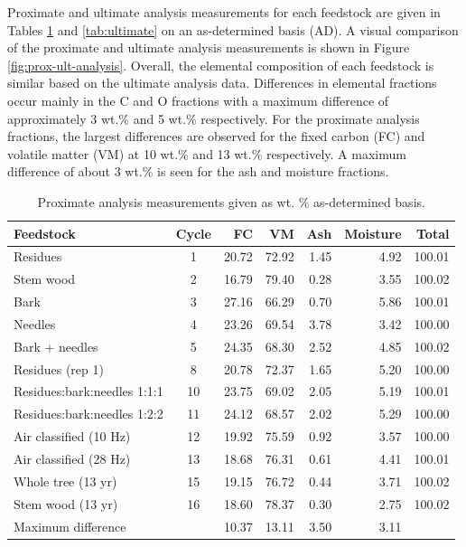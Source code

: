 Proximate and ultimate analysis measurements for each feedstock are given in Tables \ref{tab:proximate} and \ref{tab:ultimate} on an as-determined basis (AD). A visual comparison of the proximate and ultimate analysis measurements is shown in Figure \ref{fig:prox-ult-analysis}. Overall, the elemental composition of each feedstock is similar based on the ultimate analysis data. Differences in elemental fractions occur mainly in the C and O fractions with a maximum difference of approximately 3 wt.\% and 5 wt.\% respectively. For the proximate analysis fractions, the largest differences are observed for the fixed carbon (FC) and volatile matter (VM) at 10 wt.\% and 13 wt.\% respectively. A maximum difference of about 3 wt.\% is seen for the ash and moisture fractions.

\begin{table}[H]
    \caption{Proximate analysis measurements given as wt. \% as-determined basis.}
    \label{tab:proximate}
    \centering
    \begin{tabular}{lcrrrrr}
        \toprule
        Feedstock & Cycle & FC & VM & Ash & Moisture & Total \\
        \midrule
        Residues                    & 1  & 20.72 & 72.92 & 1.45 & 4.92 & 100.01 \\
        Stem wood                   & 2  & 16.79 & 79.40 & 0.28 & 3.55 & 100.02 \\
        Bark                        & 3  & 27.16 & 66.29 & 0.70 & 5.86 & 100.01 \\
        Needles                     & 4  & 23.26 & 69.54 & 3.78 & 3.42 & 100.00 \\
        Bark + needles              & 5  & 24.35 & 68.30 & 2.52 & 4.85 & 100.02 \\
        Residues (rep 1)            & 8  & 20.78 & 72.37 & 1.65 & 5.20 & 100.00 \\
        Residues:bark:needles 1:1:1 & 10 & 23.75 & 69.02 & 2.05 & 5.19 & 100.01 \\
        Residues:bark:needles 1:2:2 & 11 & 24.12 & 68.57 & 2.02 & 5.29 & 100.00 \\
        Air classified (10 Hz)      & 12 & 19.92 & 75.59 & 0.92 & 3.57 & 100.00 \\
        Air classified (28 Hz)      & 13 & 18.68 & 76.31 & 0.61 & 4.41 & 100.01 \\
        Whole tree (13 yr)          & 15 & 19.15 & 76.72 & 0.44 & 3.71 & 100.02 \\
        Stem wood (13 yr)           & 16 & 18.60 & 78.37 & 0.30 & 2.75 & 100.02 \\
        \cmidrule{3-6}
        \multicolumn{2}{l}{Maximum difference} & 10.37 & 13.11 & 3.50 & 3.11 & \\
        \bottomrule
    \end{tabular}
\end{table}

